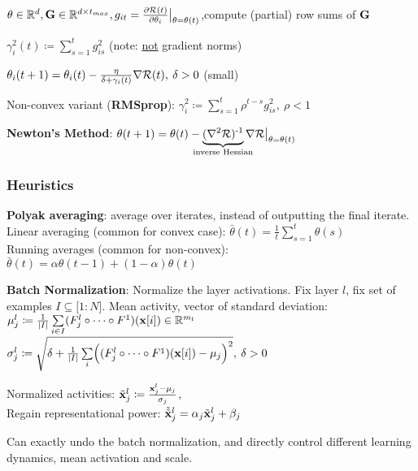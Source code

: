         $\theta\in\mathbb R^d,\mathbf G\in\mathbb R^{d\times t_{max}}, g_{it}=\frac{\partial\mathcal{R}(t)}{\partial\theta_i}\bigr|_{\theta=\theta(t)}$,compute (partial) row sums of $\mathbf G$
        
        \tab$\gamma^2_i(t)\coloneqq\sum\limits^t_{s=1}g^2_{is}$ (note: \underline{not} gradient norms)
        
        \tab$\theta_i(t+1)=\theta_i(t)-\frac{\eta}{\delta+\gamma_i(t)}\nabla\mathcal{R}(t),\> \delta>0$ (small)
        
        Non-convex variant (\textbf{RMSprop}): $\gamma_i^2\coloneqq\sum\limits_{s=1}^t\rho^{t-s}g^2_{is},\>\rho<1$
        
        \textbf{Newton's Method}: $\theta(t+1)=\theta(t)-\!\!\!\!\!\underbrace{(\nabla^2\cR)\inv}_\text{inverse Hessian}\!\!\!\!\!\nabla\cR\bigr|_{\theta=\theta(t)}$
        
    
    \subsubsection{Heuristics}
    \label{ssub:heuristics}
        \textbf{Polyak averaging}: average over iterates, instead of outputting the final iterate.\\
        Linear averaging (common for convex case): $\bar{\theta}(t)=\frac{1}{t}\sum\limits_{s=1}^t\theta(s)$\\
        Running averages (common for non-convex): $\bar{\theta}(t)=\alpha\theta(t-1)+(1-\alpha)\theta(t)$
        
        \textbf{Batch Normalization}: Normalize the layer activations. Fix layer $l$, fix set of examples $I\subseteq\lbrack1:N\rbrack$. Mean activity, vector of standard deviation:\\
        
        \tab$\mu_j^l\coloneqq\frac{1}{\lvert I\rvert}\sum\limits_{i\in I}(F^l_j\circ\cdots\circ F^1)(\mathbf x\lbrack i\rbrack)\in\mathbb R^{m_l}$\\
        \tab$\sigma^l_j\coloneqq\sqrt{\delta+\frac{1}{\lvert I\rvert}\sum\limits_i\Bigr((F^l_j\circ\cdots\circ F^1)(\mathbf x\lbrack i\rbrack)-\mu_j\Bigr)^2},\>\delta>0$
        
        Normalized activities: $\Tilde{\mathbf x}^l_j\coloneqq\frac{\mathbf x^l_j-\mu_j}{\sigma_j}$,\\
        Regain representational power: $\Tilde{\Tilde{\mathbf x}}^l_j=\alpha_j\Tilde{\mathbf x}^l_j+\beta_j$
        
        Can exactly undo the batch normalization, and directly control different learning dynamics, mean activation and scale.
    
